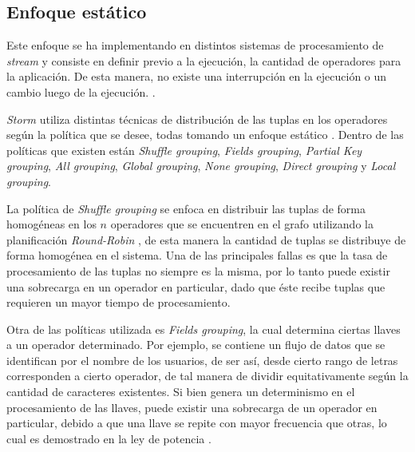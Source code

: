 \subsection{Enfoque estático}
\label{subsec:enfoqueEstaticoBC}
Este enfoque se ha implementando en distintos sistemas de procesamiento de \textsl{stream} y consiste en definir previo a la ejecución, la cantidad de operadores para la aplicación. De esta manera, no existe una interrupción en la ejecución o un cambio luego de la ejecución. \citep{CasavantK88}.


\textsl{Storm} utiliza distintas técnicas de distribución de las tuplas en los operadores según la política que se desee, todas tomando un enfoque estático \citep{stormtwitter}. Dentro de las políticas que existen están \textit{Shuffle grouping}, \textit{Fields grouping}, \textit{Partial Key grouping}, \textit{All grouping}, \textit{Global grouping}, \textit{None grouping}, \textit{Direct grouping} y \textit{Local grouping}.

La política de \textit{Shuffle grouping} se enfoca en distribuir las tuplas de forma homogéneas en los $n$ operadores que se encuentren en el grafo utilizando la planificación \textit{Round-Robin} \citep{bookScheduling}, de esta manera la cantidad de tuplas se distribuye de forma homogénea en el sistema. Una de las principales fallas es que la tasa de procesamiento de las tuplas no siempre es la misma, por lo tanto puede existir una sobrecarga en un operador en particular, dado que éste recibe tuplas que requieren un mayor tiempo de procesamiento.

Otra de las políticas utilizada es \textit{Fields grouping}, la cual determina ciertas llaves a un operador determinado. Por ejemplo, se contiene un flujo de datos que se identifican por el nombre de los usuarios, de ser así, desde cierto rango de letras corresponden a cierto operador, de tal manera de dividir equitativamente según la cantidad de caracteres existentes. Si bien genera un determinismo en el procesamiento de las llaves, puede existir una sobrecarga de un operador en particular, debido a que una llave se repite con mayor frecuencia que otras, lo cual es demostrado en la ley de potencia \citep{rushton2010handbook}.

